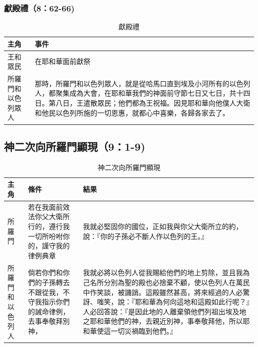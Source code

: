 \documentclass{ctexart}
\begin{document}
\subsubsection{獻殿禮（8：62-66)}
\begin{table}[!hbp]
\centering 
\begin{tabular}{|p{4cm}|p{12cm}|}
\hline
\hline
主角 &事件\\\hline\hline
王和眾民& 在耶和華面前獻祭    \\\hline
所羅門和以色列眾人&那時，所羅門和以色列眾人，就是從哈馬口直到埃及小河所有的以色列人，都聚集成為大會，在耶和華我們的神面前守節七日又七日，共十四日。第八日，王遣散眾民；他們都為王祝福。因見耶和華向他僕人大衛和他民以色列所施的一切恩惠，就都心中喜樂，各歸各家去了。\\\hline
\end{tabular}
\caption{獻殿禮}
\end{table}


\subsection{神二次向所羅門顯現（9：1-9)}
\begin{table}[!hbp]
\centering 
\begin{tabular}{|p{1cm}|p{4cm}|p{12cm}|}
\hline
\hline
主角 & 條件 &結果\\\hline\hline
所羅門& 若在我面前效法你父大衛所行的，遵行我一切所吩咐你的，謹守我的律例典章  & 我就必堅固你的國位，正如我與你父大衛所立的約，說：『你的子孫必不斷人作以色列的王。』   \\\hline
所羅門和以色列人   &倘若你們和你們的子孫轉去不跟從我，不守我指示你們的誡命律例，去事奉敬拜別神，&我就必將以色列人從我賜給他們的地上剪除，並且我為己名所分別為聖的殿也必捨棄不顧，使以色列人在萬民中作笑談，被譏誚。這殿雖然甚高，將來經過的人必驚訝、嗤笑，說：『耶和華為何向這地和這殿如此行呢？』人必回答說：『是因此地的人離棄領他們列祖出埃及地之耶和華他們的神，去親近別神，事奉敬拜他，所以耶和華使這一切災禍臨到他們。』  \\\hline
\end{tabular}
\caption{神二次向所羅門顯現}
\end{table}
\end{document}
